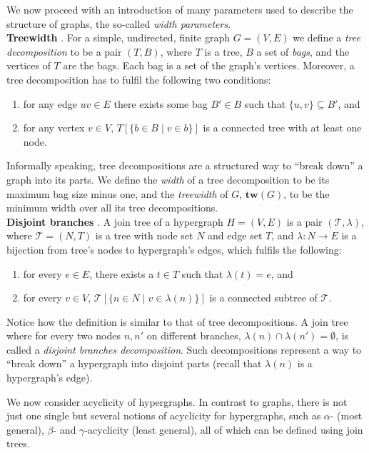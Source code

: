 \documentclass{article}
\begin{document}
We now proceed with an introduction of many parameters used to describe the structure of graphs, the so-called {\em width parameters}. \\

\noindent
\textbf{Treewidth} \cite{DBLP:conf/sat/GanianS17}.
For a simple, undirected, finite graph $G = (V,E)$ we define a {\em tree decomposition} to be a pair $(T, B)$, where $T$ is a tree, $B$ a set of {\em bags}, and the vertices of $T$ are the bags.
Each bag is a set of the graph's vertices.
Moreover, a tree decomposition has to fulfil the following two conditions:
\begin{enumerate}
	\item for any edge $uv\in E$ there exists some bag $B' \in B$ such that $\{u,v\} \subseteq B'$, and
	\item for any vertex $v\in V$, $T[\{ b \in B \; | \; v \in b \}]$ is a connected tree with at least one node.
\end{enumerate}
Informally speaking, tree decompositions are a structured way to ``break down'' a graph into its parts.
We define the {\em width} of a tree decomposition to be its maximum bag size minus one, and the {\em treewidth} of $G$, $\textbf{tw}(G)$, to be the minimum width over all its tree decompositions.\\

\noindent 
\textbf{Disjoint branches} \cite{DBLP:conf/sat/CapelliDM14}.
A join tree of a hypergraph $H=(V,E)$ is a pair $(\mathcal{T}, \lambda)$, where $\mathcal{T}=(N,T)$ is a tree with node set $N$ and edge set $T$, and $\lambda : N \rightarrow E$ is a bijection from tree's nodes to hypergraph's edges, which fulfils the following:
\begin{enumerate}
	\item for every $e\in E$, there exists a $t\in T$ such that $\lambda(t)=e$, and
	\item for every $v\in V$, $\mathcal{T}[\{ n \in N \; | \; v \in \lambda(n) \}]$ is a connected subtree of $\mathcal{T}$.
\end{enumerate}
Notice how the definition is similar to that of tree decompositions.
A join tree where for every two nodes $n, n'$ on different branches, $\lambda(n) \cap \lambda(n') = \emptyset$, is called a {\em disjoint branches decomposition}. 
Such decompositions represent a way to ``break down'' a hypergraph into disjoint parts (recall that $\lambda(n)$ is a hypergraph's edge).

We now consider acyclicity of hypergraphs.
In contrast to graphs, there is not just one single but several notions of acyclicity for hypergraphs, such as $\alpha$- (most general), $\beta$- and $\gamma$-acyclicity (least general), all of which can be defined using join trees.
\end{document}
